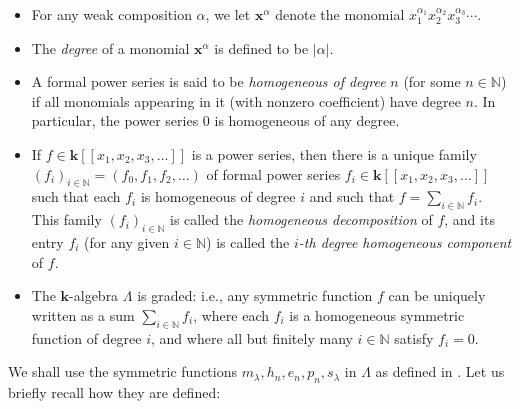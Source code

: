 \documentclass[numbers=enddot,12pt,final,onecolumn,notitlepage]{scrartcl}%
\theoremstyle{definition}
\let\sumnonlimits\sum
\renewcommand{\sum}{\sumnonlimits\limits}
\begin{document}
\begin{itemize}
\item For any weak composition $\alpha$, we let $\mathbf{x}^{\alpha}$ denote
the monomial $x_{1}^{\alpha_{1}}x_{2}^{\alpha_{2}}x_{3}^{\alpha_{3}}\cdots$.

\item The \emph{degree} of a monomial $\mathbf{x}^{\alpha}$ is defined to be
$\left\vert \alpha\right\vert $.

\item A formal power series is said to be \emph{homogeneous of degree }$n$
(for some $n\in\mathbb{N}$) if all monomials appearing in it (with nonzero
coefficient) have degree $n$. In particular, the power series $0$ is
homogeneous of any degree.

\item If $f\in\mathbf{k}\left[  \left[  x_{1},x_{2},x_{3},\ldots\right]
\right]  $ is a power series, then there is a unique family $\left(
f_{i}\right)  _{i\in\mathbb{N}}=\left(  f_{0},f_{1},f_{2},\ldots\right)  $ of
formal power series $f_{i}\in\mathbf{k}\left[  \left[  x_{1},x_{2}%
,x_{3},\ldots\right]  \right]  $ such that each $f_{i}$ is homogeneous of
degree $i$ and such that $f=\sum_{i\in\mathbb{N}}f_{i}$. This family $\left(
f_{i}\right)  _{i\in\mathbb{N}}$ is called the \emph{homogeneous
decomposition} of $f$, and its entry $f_{i}$ (for any given $i\in\mathbb{N}$)
is called the $i$\emph{-th degree homogeneous component} of $f$.

\item The $\mathbf{k}$-algebra $\Lambda$ is graded: i.e., any symmetric
function $f$ can be uniquely written as a sum $\sum_{i\in\mathbb{N}}f_{i}$,
where each $f_{i}$ is a homogeneous symmetric function of degree $i$, and
where all but finitely many $i\in\mathbb{N}$ satisfy $f_{i}=0$.
\end{itemize}

We shall use the symmetric functions $m_{\lambda},h_{n},e_{n},p_{n}%
,s_{\lambda}$ in $\Lambda$ as defined in \cite[Sections 2.1 and 2.2]{GriRei}.
Let us briefly recall how they are defined:
\end{document}
